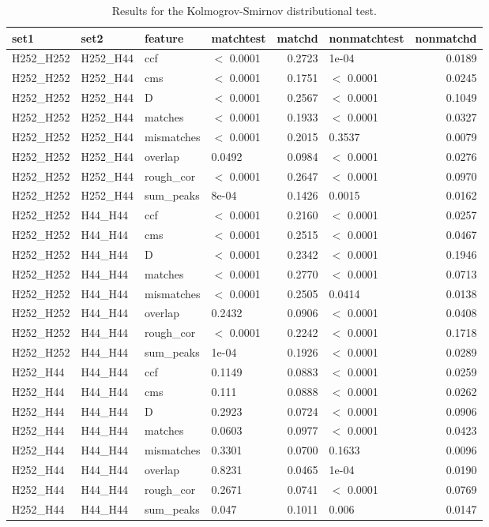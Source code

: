 \documentclass[12pt,]{article}
\theoremstyle{definition}
\theoremstyle{definition}
\theoremstyle{definition}
\theoremstyle{remark}
\begin{document}
\begin{table}[H]
\centering
\begin{tabular}{llllrlr}
  \hline
set1 & set2 & feature & matchtest & matchd & nonmatchtest & nonmatchd \\ 
  \hline
H252\_H252 & H252\_H44 & ccf & $<$ 0.0001 & 0.2723 & 1e-04 & 0.0189 \\ 
  H252\_H252 & H252\_H44 & cms & $<$ 0.0001 & 0.1751 & $<$ 0.0001 & 0.0245 \\ 
  H252\_H252 & H252\_H44 & D & $<$ 0.0001 & 0.2567 & $<$ 0.0001 & 0.1049 \\ 
  H252\_H252 & H252\_H44 & matches & $<$ 0.0001 & 0.1933 & $<$ 0.0001 & 0.0327 \\ 
  H252\_H252 & H252\_H44 & mismatches & $<$ 0.0001 & 0.2015 & 0.3537 & 0.0079 \\ 
  H252\_H252 & H252\_H44 & overlap & 0.0492 & 0.0984 & $<$ 0.0001 & 0.0276 \\ 
  H252\_H252 & H252\_H44 & rough\_cor & $<$ 0.0001 & 0.2647 & $<$ 0.0001 & 0.0970 \\ 
  H252\_H252 & H252\_H44 & sum\_peaks & 8e-04 & 0.1426 & 0.0015 & 0.0162 \\ 
  H252\_H252 & H44\_H44 & ccf & $<$ 0.0001 & 0.2160 & $<$ 0.0001 & 0.0257 \\ 
  H252\_H252 & H44\_H44 & cms & $<$ 0.0001 & 0.2515 & $<$ 0.0001 & 0.0467 \\ 
  H252\_H252 & H44\_H44 & D & $<$ 0.0001 & 0.2342 & $<$ 0.0001 & 0.1946 \\ 
  H252\_H252 & H44\_H44 & matches & $<$ 0.0001 & 0.2770 & $<$ 0.0001 & 0.0713 \\ 
  H252\_H252 & H44\_H44 & mismatches & $<$ 0.0001 & 0.2505 & 0.0414 & 0.0138 \\ 
  H252\_H252 & H44\_H44 & overlap & 0.2432 & 0.0906 & $<$ 0.0001 & 0.0408 \\ 
  H252\_H252 & H44\_H44 & rough\_cor & $<$ 0.0001 & 0.2242 & $<$ 0.0001 & 0.1718 \\ 
  H252\_H252 & H44\_H44 & sum\_peaks & 1e-04 & 0.1926 & $<$ 0.0001 & 0.0289 \\ 
  H252\_H44 & H44\_H44 & ccf & 0.1149 & 0.0883 & $<$ 0.0001 & 0.0259 \\ 
  H252\_H44 & H44\_H44 & cms & 0.111 & 0.0888 & $<$ 0.0001 & 0.0262 \\ 
  H252\_H44 & H44\_H44 & D & 0.2923 & 0.0724 & $<$ 0.0001 & 0.0906 \\ 
  H252\_H44 & H44\_H44 & matches & 0.0603 & 0.0977 & $<$ 0.0001 & 0.0423 \\ 
  H252\_H44 & H44\_H44 & mismatches & 0.3301 & 0.0700 & 0.1633 & 0.0096 \\ 
  H252\_H44 & H44\_H44 & overlap & 0.8231 & 0.0465 & 1e-04 & 0.0190 \\ 
  H252\_H44 & H44\_H44 & rough\_cor & 0.2671 & 0.0741 & $<$ 0.0001 & 0.0769 \\ 
  H252\_H44 & H44\_H44 & sum\_peaks & 0.047 & 0.1011 & 0.006 & 0.0147 \\ 
   \hline
\end{tabular}
\caption{Results for the Kolmogrov-Smirnov distributional test.} 
\label{tab:kstests}
\end{table}
\end{document}
